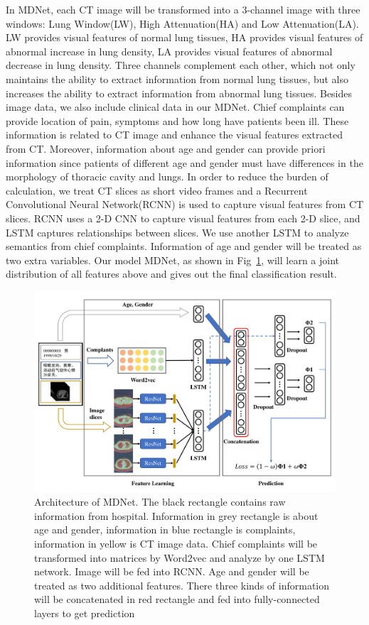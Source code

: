\documentclass[journal]{IEEEtran}
\begin{document}
In MDNet, each CT image will be transformed into a 3-channel image with three windows: Lung Window(LW), High Attenuation(HA) and Low Attenuation(LA). LW provides visual features of normal lung tissues, HA provides visual features of abnormal increase in lung density, LA provides visual features of abnormal decrease in lung density. Three channels complement each other, which not only maintains the ability to extract information from normal lung tissues, but also increases the ability to extract information from abnormal lung tissues.
Besides image data, we also include clinical data in our MDNet. Chief complaints can provide location of pain, symptoms and how long have patients been ill. These information is related to CT image and enhance the visual features extracted from CT. Moreover, information about age and gender can provide priori information since patients of different age and gender must have differences in the morphology of thoracic cavity and lungs. 
In order to reduce the burden of calculation, we treat CT slices as short video frames and a Recurrent Convolutional Neural Network(RCNN) is used to capture visual features from CT slices. RCNN uses a 2-D CNN to capture visual features from each 2-D slice, and LSTM captures relationships between slices. We use another LSTM to analyze semantics from chief complaints. Information of age and gender will be treated as two extra variables. Our model MDNet, as shown in Fig~\ref{MMDD}, will learn a joint distribution of all features above and gives out the final classification result.

\begin{figure}[t]
    \centerline{\includegraphics[width=160mm]{MMDD.pdf}}
    \vspace{-0cm}
    \caption{Architecture of MDNet. The black rectangle contains raw information from hospital. Information in grey rectangle is about age and gender, information in blue rectangle is complaints, information in yellow is CT image data. Chief complaints will be transformed into matrices by Word2vec and analyze by one LSTM network. Image will be fed into RCNN. Age and gender will be treated as two additional features. There three kinds of information will be concatenated in red rectangle and fed into fully-connected layers to get prediction}
    \vspace{-0cm}
    \label{MMDD}
    \end{figure}
\end{document}
